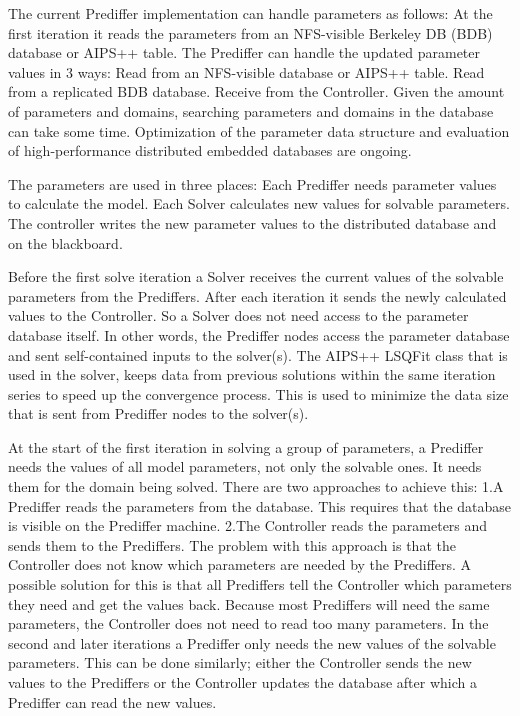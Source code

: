 \documentclass[10pt]{lofar}
\begin{document}
The current Prediffer implementation can handle parameters as follows:
At the first iteration it reads the parameters from an NFS-visible Berkeley DB (BDB) database or AIPS++ table.
The Prediffer can handle the updated parameter values in 3 ways:
Read from an NFS-visible database or AIPS++ table.
Read from a replicated BDB database.
Receive from the Controller.
Given the amount of parameters and domains, searching parameters and domains in the database can take some time. Optimization of the parameter data structure and evaluation of high-performance distributed embedded databases are ongoing.

The parameters are used in three places:
Each Prediffer needs parameter values to calculate the model.
Each Solver calculates new values for solvable parameters.
The controller writes the new parameter values to the distributed database and on the blackboard.

Before the first solve iteration a Solver receives the current values of the solvable parameters from the Prediffers. After each iteration it sends the newly calculated values to the Controller. So a Solver does not need access to the parameter database itself. In other words, the Prediffer nodes access the parameter database and sent self-contained inputs to the solver(s).
The AIPS++ LSQFit class that is used in the solver, keeps data from previous solutions within the same iteration series to speed up the convergence process. This is used to minimize the data size that is sent from Prediffer nodes to the solver(s).

At the start of the first iteration in solving a group of parameters, a Prediffer needs the values of all model parameters, not only the solvable ones. It needs them for the domain being solved. There are two approaches to achieve this:
1.A Prediffer reads the parameters from the database. This requires that the database is visible on the Prediffer machine.
2.The Controller reads the parameters and sends them to the Prediffers.
The problem with this approach is that the Controller does not know which parameters are needed by the Prediffers. A possible solution for this is that all Prediffers tell the Controller which parameters they need and get the values back. Because most Prediffers will need the same parameters, the Controller does not need to read too many parameters.
In the second and later iterations a Prediffer only needs the new values of the solvable parameters. This can be done similarly; either the Controller sends the new values to the Prediffers or the Controller updates the database after which a Prediffer can read the new values.
\end{document}
